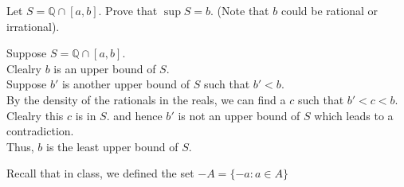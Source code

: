 \documentclass[answers,12pt,addpoints]{exam}
\begin{document}
\begin{questions}
    \question Let $S = \mathbb{Q} \cap [a, b]$. Prove that $\sup S = b$. (Note that $b$ could be rational or irrational).
    \begin{solution}
        Suppose $S = \mathbb{Q} \cap [a, b]$. \\
        Clealry $b$ is an upper bound of $S$. \\
        Suppose $b'$ is another upper bound of $S$ such that $b' < b$. \\
        By the density of the rationals in the reals, we can find a $c$ such that $b' < c < b$. \\
        Clealry this $c$ is in $S$. and hence $b'$ is not an upper bound of $S$ which leads to a contradiction. \\
        Thus, $b$ is the least upper bound of $S$.
    \end{solution}

    \question Recall that in class, we defined the set $-A = \{-a : a \in A\}$
\end{questions}
\end{document}
